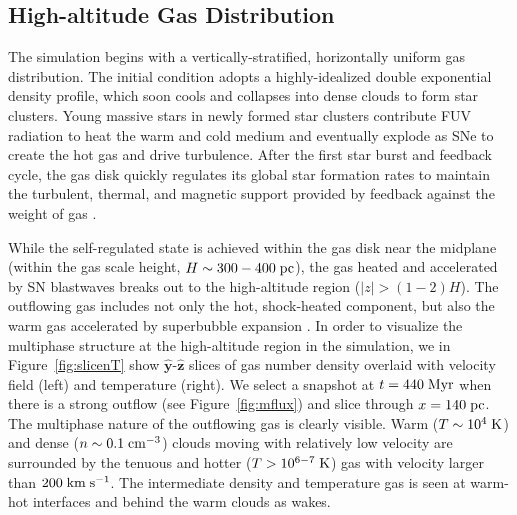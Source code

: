 \documentclass[twocolumn]{aastex62}
\newcommand\pcc{\;{\rm cm}^{-3}}
\newcommand\kms{\; {\rm km}\;{\rm s}^{-1}}
\newcommand\Myr{\;{\rm Myr}}
\newcommand\pc{\;{\rm pc}}
\newcommand\Kel{\;{\rm K}}
\newcommand\yhat{\hat{\mathbf{y}} }
\newcommand\zhat{\hat{\mathbf{z}} }
\begin{document}
\subsection{High-altitude Gas Distribution}\label{subsec:tigress_gas_dist}

The simulation begins with a vertically-stratified, horizontally uniform gas distribution. The initial condition adopts a highly-idealized double exponential density profile, which soon cools and collapses into dense clouds to form star clusters. Young massive stars in newly formed star clusters contribute FUV radiation to heat the warm and cold medium and eventually explode as SNe to create the hot gas and drive turbulence. After the first star burst and feedback cycle, the gas disk quickly regulates its global star formation rates to maintain the turbulent, thermal, and magnetic support provided by feedback against the weight of gas \citep[e.g.,][]{KOK13, KO15b, Kim&Ostriker17}.

While the self-regulated state is achieved within the gas disk near the midplane (within the gas scale height, $H\sim 300-400\pc$), the gas heated and accelerated by SN blastwaves breaks out to the high-altitude region ($|z|>(1-2)H$). The outflowing gas includes not only the hot, shock-heated component, but also the warm gas accelerated by superbubble expansion \citep[see][]{Kim&Ostriker18}. In order to visualize the multiphase structure at the high-altitude region in the simulation, we in Figure~\ref{fig:slicenT} show $\yhat$-$\zhat$ slices of gas number density overlaid with velocity field (left) and temperature (right). We select a snapshot at $t=440\Myr$ when there is a strong outflow (see Figure~\ref{fig:mflux}) and slice through $x=140\pc$. The multiphase nature of the outflowing gas is clearly visible. Warm ($T\sim10^4\Kel$) and dense ($n\sim0.1\pcc$) clouds moving with relatively low velocity are surrounded by the tenuous and hotter ($T>10^{6-7}\Kel$) gas with velocity larger than $200\kms$. The intermediate density and temperature gas is seen at warm-hot interfaces and behind the warm clouds as wakes.
\end{document}

